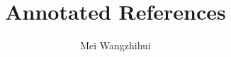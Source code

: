 \documentclass[11pt]{article}
\author{Mei Wangzhihui}
\begin{document}
 
\title{Annotated References}\nocite{*} %

\maketitle


 
\end{document}
